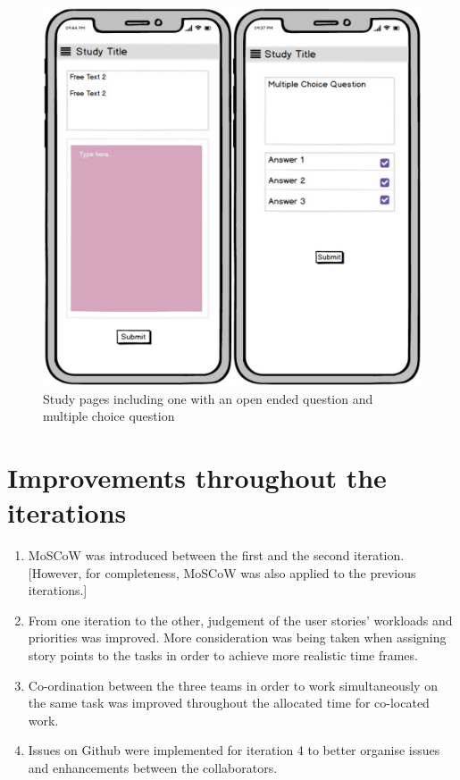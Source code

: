 \documentclass[12pt, a4paper]{report}
\begin{document}
\begin{figure} [h]
\centering
\includegraphics[scale=0.35]{images/pic5.jpg}
\caption{\centering Study pages including one with an open ended question and  multiple choice question}
\end{figure}

\clearpage


\newpage
\section{Improvements throughout the iterations}
\begin{enumerate}
    \item MoSCoW was introduced between the first and the second iteration. [However, for completeness, MoSCoW was also applied to the previous iterations.]
    \item From one iteration to the other, judgement of the user stories' workloads and priorities was improved. More consideration was being taken when assigning story points to the tasks in order to achieve more realistic time frames. 
    \item Co-ordination between the three teams in order to work simultaneously on the same task was improved throughout the allocated time for co-located work.
    \item Issues on Github were implemented for iteration 4 to better organise issues and enhancements between the collaborators.
\end{enumerate}
\end{document}
